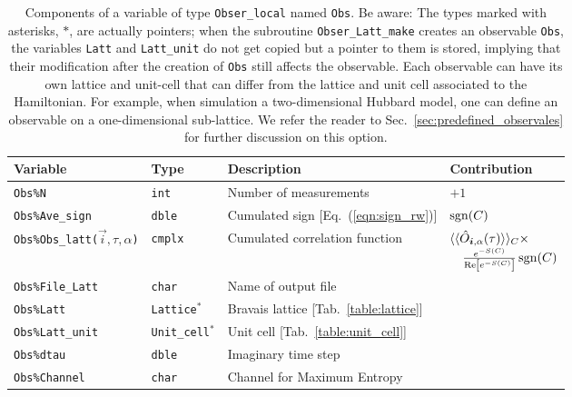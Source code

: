 %
\begin{table}[h!]
	\begin{center}
	\begin{tabular}{@{} p{}  l  p{} p{} @{}}\toprule
		Variable  &  Type      &  Description &  Contribution \\\midrule
		\texttt{Obs\%N}                       &  \texttt{int}        &   Number of measurements &    $+1$\\
		\texttt{Obs\%Ave\_sign} &  \texttt{dble}  &    Cumulated sign [Eq.~(\ref{eqn:sign_rw})] & $\operatorname{sgn}(C)$  \\
		\texttt{Obs\%Obs\_latt($\vec{i}, \allowbreak \tau,\alpha$)}        & \texttt{cmplx}      &    Cumulated correlation function & 
      $ \begin{multlined}[t] \langle \langle \hat{O}_{\vec{i},\alpha} (\tau) \rangle \rangle_{C} \times\\[-0.5ex] \tfrac{e^{-S(C)}} {\Re \left[e^{-S(C)} \right]}  \sgn(C) \end{multlined}$  
      \\
		\texttt{Obs\%File\_Latt}           &   \texttt{char}   &    Name of output file  &
		\\
		\texttt{Obs\%Latt} & \texttt{Lattice}$^*$ & Bravais lattice [Tab.~\ref{table:lattice}] & \\
		\texttt{Obs\%Latt\_unit} & \texttt{Unit\_cell}$^*$ & Unit cell [Tab.~\ref{table:unit_cell}] & \\
		\texttt{Obs\%dtau} & \texttt{dble} & Imaginary time step & \\
		\texttt{Obs\%Channel} & \texttt{char} & Channel for Maximum Entropy &
		\\\bottomrule
	\end{tabular}
	\caption{Components of a variable of type \texttt{Obser\_local} named \texttt{Obs}. 
	Be aware: The types marked with asterisks, $*$, are actually pointers; when the subroutine \texttt{Obser\_Latt\_make} creates an observable \texttt{Obs}, the variables \texttt{Latt} and \texttt{Latt\_unit} do not get copied but a pointer to them is stored, implying that their modification
after the creation of \texttt{Obs} still affects the observable.    Each  observable  can have its  own lattice  and  unit-cell  that  can  differ  from  the lattice  and  unit  cell  associated to the Hamiltonian. For  example,    when  simulation a  two-dimensional  Hubbard model,  one  can  define an observable on a one-dimensional sub-lattice. We refer the reader to Sec.~\ref{sec:predefined_observales} for further discussion on this option.}
	\label{table:Obser_local}
\end{center}
\end{table}
